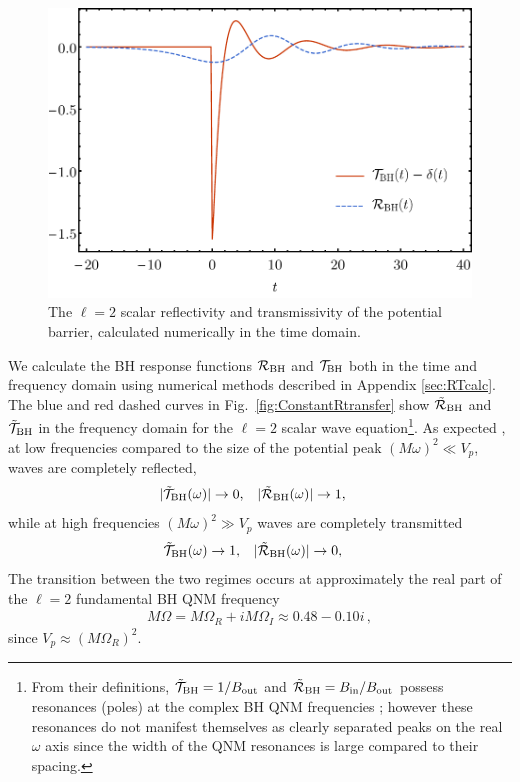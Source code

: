 \begin{refsection}
\begin{figure}[t]
\includegraphics[width =1.0 \columnwidth]{chapter_echo/etc/TRplot}
\caption{ The $\ell =2$ scalar reflectivity and transmissivity of the potential barrier, calculated numerically in the time domain.}
\label{fig:RTtimeDom}
\end{figure}

We calculate the BH response functions $\mathcal R_{\rm BH}$ and $\mathcal T_{\rm BH}$ both in the time and frequency domain using numerical methods described in Appendix \ref{sec:RTcalc}.
The blue and red dashed curves in Fig.~\ref{fig:ConstantRtransfer} show $\tilde{\mathcal R}_{\rm BH}$ and $\tilde{\mathcal T}_{\rm BH}$ in the frequency domain for the $\ell =2$ scalar wave equation\footnote{
From their definitions,  $\tilde{\mathcal T}_{\rm BH}=1/B_{\rm out}$ and $\tilde{\mathcal R}_{\rm BH}=B_{\rm in}/B_{\rm out}$ possess resonances (poles) at the complex BH QNM frequencies \cite{Berti:2009kk}; however these resonances do not manifest themselves as clearly separated peaks on the real $\omega$ axis since the width of the QNM resonances is large compared to their spacing.
}. 
As expected \cite{Caponthesis,wheeler1972magic,Frolov:1998wf}, at low frequencies compared to the size of the potential peak $(M\omega)^2 \ll V_p$, waves are completely reflected,
\begin{align}
&|\tilde{\mathcal T}_{\rm BH}(\omega) |\to 0,& &|\tilde{\mathcal R}_{\rm BH}(\omega) |\to 1,
\end{align}
while at high frequencies $(M\omega)^2 \gg V_p$ waves are completely transmitted
\begin{align}
&\tilde{\mathcal T}_{\rm BH}(\omega) \to 1,& &|\tilde{\mathcal R}_{\rm BH}(\omega) |\to 0,
\end{align}
The transition between the two regimes occurs at approximately the real part of the $\ell = 2$ fundamental BH QNM frequency  
\begin{align}
M\Omega = M\Omega_R + i M\Omega_I \approx 0.48-0.10i \,,
\end{align}
since $V_p\approx (M\Omega_R)^2$.


\end{refsection}
